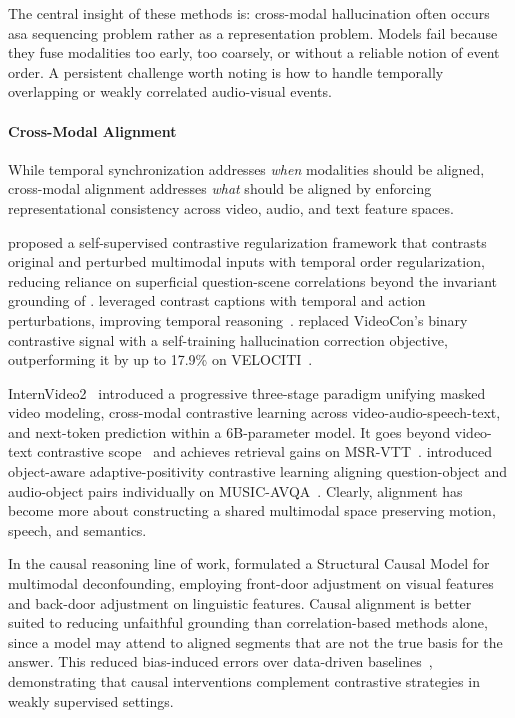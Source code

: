 \documentclass[10pt]{article} %
\begin{document}
The central insight of these methods is: cross-modal hallucination often occurs asa sequencing problem rather as a representation problem. Models fail because they fuse modalities too early, too coarsely, or without a reliable notion of event order. A persistent challenge worth noting is how to handle temporally overlapping or weakly correlated audio-visual events.

\paragraph{Cross-Modal Alignment}

While temporal synchronization addresses \emph{when} modalities should be aligned, cross-modal alignment addresses \emph{what} should be aligned by enforcing representational consistency across video, audio, and text feature spaces.

\citet{Yang2024RobustVQ} proposed a self-supervised contrastive regularization framework that contrasts original and perturbed multimodal inputs with temporal order regularization, reducing reliance on superficial question-scene correlations beyond the invariant grounding of \citet{Li2022InvariantGF}. \citet{Bansal2023VideoConRV} leveraged contrast captions with temporal and action perturbations, improving temporal reasoning~\citep{Bagad2023TestOT, Momeni2023VerbsIA}. \citet{Zhao2025CanHC} replaced VideoCon's binary contrastive signal with a self-training hallucination correction objective, outperforming it by up to 17.9\% on VELOCITI~\citep{saravanan2025velociti}.

InternVideo2~\citep{Wang2024InternVideo2SF} introduced a progressive three-stage paradigm unifying masked video modeling, cross-modal contrastive learning across video-audio-speech-text, and next-token prediction within a 6B-parameter model. It goes beyond video-text contrastive scope~\citep{Li2023UnmaskedTT} and achieves retrieval gains on MSR-VTT~\citep{xu2016msr-vtt}. \citet{Li2023ObjectawareAL} introduced object-aware adaptive-positivity contrastive learning aligning question-object and audio-object pairs individually on MUSIC-AVQA~\citep{li2022learning}. Clearly, alignment has become more about constructing a shared multimodal space preserving motion, speech, and semantics. 

In the causal reasoning line of work, \citet{Chen2025CrossmodalCR} formulated a Structural Causal Model for multimodal deconfounding, employing front-door adjustment on visual features and back-door adjustment on linguistic features. Causal alignment is better suited to reducing unfaithful grounding than correlation-based methods alone, since a model may attend to aligned segments that are not the true basis for the answer. This reduced bias-induced errors over data-driven baselines~\citep{Xiao2023CanIT}, demonstrating that causal interventions complement contrastive strategies in weakly supervised settings.
\end{document}
